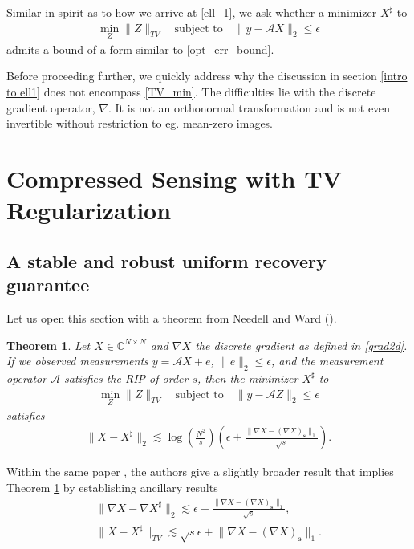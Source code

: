 \documentclass[11pt, oneside]{article}   %
\newtheorem{theorem}{Theorem}
\newcommand{\bC}{\mathbb{C}}
\newcommand{\A}{\mathcal{A}}
\newcommand{\norm}[1]{\lVert #1 \rVert}
\begin{document}
Similar in spirit as to how we arrive at \eqref{ell_1}, we ask whether a 
minimizer $X^\sharp$ to 
\begin{align}
        \min_{Z} \norm{Z}_{TV} \quad\text{subject to}\quad 
\norm{y - \A X}_2 \leq \epsilon
\label{TV_min}
\tag{TV min}
\end{align}
admits a bound of a form similar to \eqref{opt_err_bound}. 

Before proceeding further, we quickly address why the discussion in section \ref{intro to ell1} does not encompass \eqref{TV_min}. The difficulties lie with the discrete gradient operator, $\nabla$. It is not an orthonormal transformation and is not even invertible without restriction to eg. mean-zero images.

%
% 
\section{Compressed Sensing with TV Regularization}\label{sec:CS with TV}
\subsection{A stable and robust uniform recovery guarantee}
Let us open this section with a theorem from Needell and Ward 
(\!\!\cite[Theorem 2]{needell2013stable}).
\begin{theorem}\label{THM1_NW}
        Let $X \in \bC^{N\times N}$ and $\nabla X$ the discrete gradient as 
defined in \eqref{grad2d}. If we observed measurements $y = \A X + e$, 
$\norm{e}_2 \leq \epsilon$, and the measurement operator $\A$ satisfies the RIP of 
order $s$, then the minimizer $X^\sharp$ to 
\begin{align}
        \min_Z \norm{Z}_{TV} \quad\text{subject to}\quad 
\norm{y - \A Z}_2 \leq \epsilon 
\end{align}
satisfies
\begin{align}
        \norm{X - X^\sharp}_2 
\lesssim \log\left(\frac{N^2}{s}\right) \left(\epsilon + \frac{\norm{\nabla X - 
(\nabla X)_\mathbf{s}}_1}{\sqrt{s}} \right).
\label{NW_err_bound}
\end{align}
\end{theorem}
Within the same paper \cite[Theorem 5]{needell2013stable}, the authors give a 
slightly broader result that implies Theorem \ref{THM1_NW} by establishing ancillary results
\begin{align}   
        \norm{\nabla X - \nabla X^\sharp}_2 \lesssim 
\epsilon + \frac{\norm{\nabla X - (\nabla X)_\mathbf{s}}_1}{\sqrt{s}},  
 \label{opt_grad_reco}   \\
	\norm{X - X^\sharp}_{TV} \lesssim \sqrt{s}\epsilon + \norm{\nabla X - 
(\nabla X)_\mathbf{s}}_1. 
\label{TV_bound}
\end{align}
\end{document}
